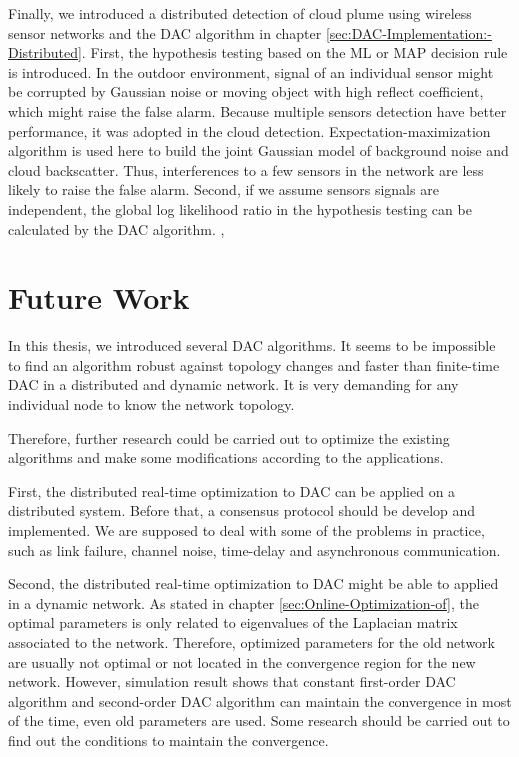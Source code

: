 Finally, we introduced a distributed detection of cloud plume using
wireless sensor networks and the DAC algorithm in chapter \ref{sec:DAC-Implementation:-Distributed}.
First, the hypothesis testing based on the ML or MAP decision rule
is introduced. In the outdoor environment, signal of an individual
sensor might be corrupted by Gaussian noise or moving object with
high reflect coefficient, which might raise the false alarm. Because
multiple sensors detection have better performance, it was adopted
in the cloud detection. Expectation-maximization algorithm is used
here to build the joint Gaussian model of background noise and cloud
backscatter. Thus, interferences to a few sensors in the network are
less likely to raise the false alarm. Second, if we assume sensors
signals are independent, the global log likelihood ratio in the hypothesis
testing can be calculated by the DAC algorithm. , 


\section{Future Work}

In this thesis, we introduced several DAC algorithms.  It seems to
be impossible to find an algorithm robust against topology changes
and faster than finite-time DAC in a distributed and dynamic network.
It is very demanding for any individual node to know the network topology. 

Therefore, further research could be carried out to optimize the existing
algorithms and make some modifications according to the applications.

First, the distributed real-time optimization to DAC can be applied
on a distributed system. Before that, a consensus protocol should
be develop and implemented. We are supposed to deal with some of the
problems in practice, such as link failure, channel noise, time-delay
and asynchronous communication. 



Second, the distributed real-time optimization to DAC might be able
to applied in a dynamic network.  As stated in chapter \ref{sec:Online-Optimization-of},
the optimal parameters is only related to eigenvalues of the Laplacian
matrix associated to the network. Therefore, optimized parameters
for the old network are usually not optimal or not located in the
convergence region for the new network. However, simulation result
shows that constant first-order DAC algorithm and second-order DAC
algorithm can maintain the convergence in most of the time, even old
parameters are used. Some research should be carried out to find out
the conditions to maintain the convergence. 

